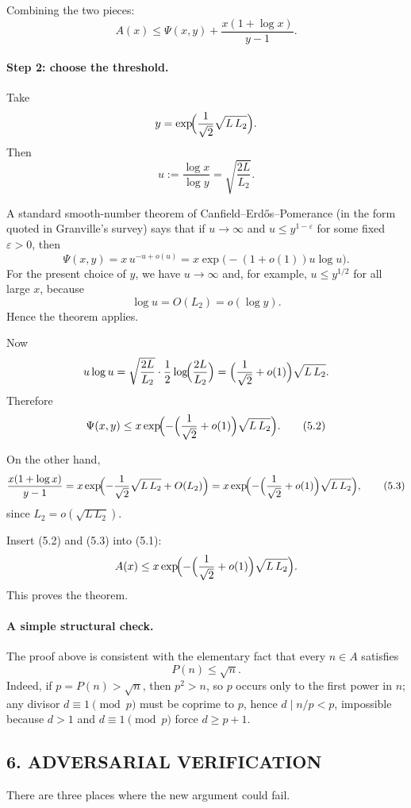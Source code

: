 Combining the two pieces:
\[
A(x)\le \Psi(x,y)+\frac{x(1+\log x)}{y-1}.
\tag{5.1}
\]

\paragraph{Step 2: choose the threshold.}
Take
\[
y=\exp\!\Bigl(\frac{1}{\sqrt 2}\sqrt{L\,L_2}\Bigr).
\]
Then
\[
u:=\frac{\log x}{\log y}=\sqrt{\frac{2L}{L_2}}.
\]

A standard smooth-number theorem of Canfield--Erd\H{o}s--Pomerance (in the form quoted in Granville's survey) says that if $u\to\infty$ and $u\le y^{1-\varepsilon}$ for some fixed $\varepsilon>0$, then
\[
\Psi(x,y)=x\,u^{-u+o(u)}=x\exp\bigl(-(1+o(1))u\log u\bigr).
\]
For the present choice of $y$, we have $u\to\infty$ and, for example, $u\le y^{1/2}$ for all large $x$, because
\[
\log u=O(L_2)=o(\log y).
\]
Hence the theorem applies.

Now
\[
u\log u
=
\sqrt{\frac{2L}{L_2}}\cdot \frac{1}{2}\log\!\Bigl(\frac{2L}{L_2}\Bigr)
=
\Bigl(\frac{1}{\sqrt 2}+o(1)\Bigr)\sqrt{L\,L_2}.
\]
Therefore
\[
\Psi(x,y)
\le
x\exp\!\Bigl(-\Bigl(\frac{1}{\sqrt 2}+o(1)\Bigr)\sqrt{L\,L_2}\Bigr).
\tag{5.2}
\]

On the other hand,
\[
\frac{x(1+\log x)}{y-1}
=
x\exp\!\Bigl(-\frac{1}{\sqrt 2}\sqrt{L\,L_2}+O(L_2)\Bigr)
=
x\exp\!\Bigl(-\Bigl(\frac{1}{\sqrt 2}+o(1)\Bigr)\sqrt{L\,L_2}\Bigr),
\tag{5.3}
\]
since $L_2=o(\sqrt{L\,L_2})$.

Insert (5.2) and (5.3) into (5.1):
\[
A(x)\le x\exp\!\Bigl(-\Bigl(\frac{1}{\sqrt 2}+o(1)\Bigr)\sqrt{L\,L_2}\Bigr).
\]
This proves the theorem.

\paragraph{A simple structural check.}
The proof above is consistent with the elementary fact that every $n\in A$ satisfies
\[
P(n)\le \sqrt n.
\]
Indeed, if $p=P(n)>\sqrt n$, then $p^2>n$, so $p$ occurs only to the first power in $n$; any divisor $d\equiv 1\pmod p$ must be coprime to $p$, hence $d\mid n/p<p$, impossible because $d>1$ and $d\equiv 1\pmod p$ force $d\ge p+1$.

\subsection*{6. ADVERSARIAL VERIFICATION}

There are three places where the new argument could fail.

